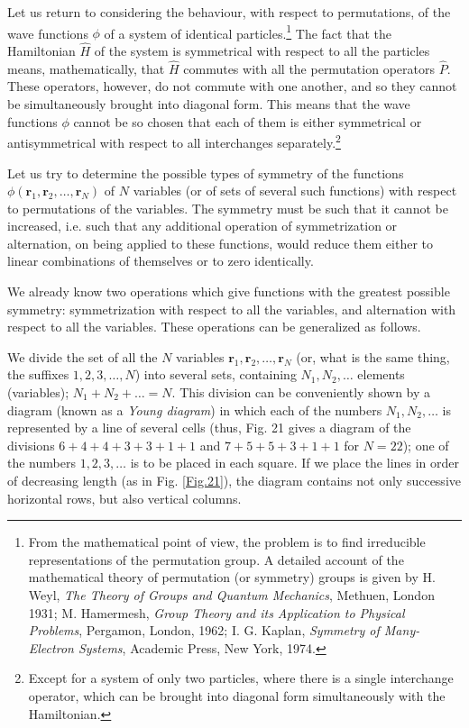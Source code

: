 Let us return to considering the behaviour, with respect to permutations, of the wave functions $\phi$ of a system of identical particles.\footnote{From the mathematical point of view, the problem is to find irreducible representations of the permutation group. A detailed account of the mathematical theory of permutation (or symmetry) groups is given by H. Weyl, \textit{The Theory of Groups and Quantum Mechanics}, Methuen, London 1931; M. Hamermesh, \textit{Group Theory and its Application to Physical Problems}, Pergamon, London, 1962; I. G. Kaplan, \textit{Symmetry of Many-Electron Systems}, Academic Press, New York, 1974.
} The fact that the Hamiltonian $\hat{H}$ of the system is symmetrical with respect to all the particles means, mathematically, that $\hat{H}$ commutes with all the permutation operators $ \hat{P} $. These operators, however, do not commute with one another, and so they cannot be simultaneously brought into diagonal form. This means that the wave functions $\phi$ cannot be so chosen that each of them is either symmetrical or antisymmetrical with respect to all interchanges separately.\footnote{Except for a system of only two particles, where there is a single interchange operator, which can be brought into diagonal form simultaneously with the Hamiltonian.
}

Let us try to determine the possible types of symmetry of the functions $ \phi(\bm{r}_1, \bm{r}_2, \dots, \bm{r}_N) $ of $ N $ variables (or of sets of several such functions) with respect to permutations of the variables. The symmetry must be such that it cannot be increased, i.e. such that any additional operation of symmetrization or alternation, on being applied to these functions, would reduce them either to linear combinations of themselves or to zero identically.

We already know two operations which give functions with the greatest possible symmetry: symmetrization with respect to all the variables, and alternation with respect to all the variables. These operations can be generalized as follows.

We divide the set of all the $ N $ variables $ \bm{r}_1, \bm{r}_2, \dots, \bm{r}_N $ (or, what is the same thing, the suffixes $ 1, 2, 3, \dots, N $) into several sets, containing $ N_1, N_2, \dots $ elements (variables); $ N_1+N_2+ \dots = N $. This division can be conveniently shown by a diagram (known as a \textit{Young diagram}) in which each of the numbers $ N_1, N_2, \dots $ is represented by a line of several cells (thus, Fig. 21 gives a diagram of the divisions $ 6+4+4+3+3+1+1 $ and $ 7+5+5+3+1+1 $ for $ N = 22 $); one of the numbers $ 1, 2, 3, \dots $ is to be placed in each square. If we place the lines in order of decreasing length (as in Fig. \ref{Fig.21}), the diagram contains not only successive horizontal rows, but also vertical columns.



